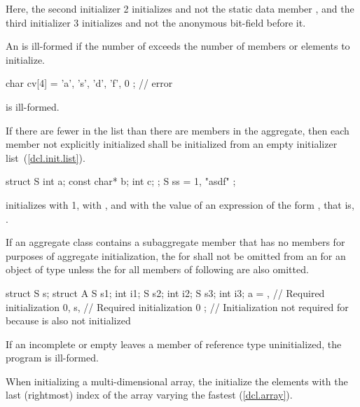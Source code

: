 Here, the second initializer 2 initializes
and not the static data member
, and the third initializer 3 initializes 
and not the anonymous bit-field before it.
\exitexample

\pnum
An
is ill-formed if the number of
exceeds the number of members or elements to initialize.
\enterexample

\begin{codeblock}
char cv[4] = { 'a', 's', 'd', 'f', 0 };     // error
\end{codeblock}

is ill-formed.
\exitexample

\pnum
If there are fewer
in the list than there are members in the aggregate,
then each member not explicitly initialized
shall be
initialized from an empty initializer list~(\ref{dcl.init.list}).
\enterexample

\begin{codeblock}
struct S { int a; const char* b; int c; };
S ss = { 1, "asdf" };
\end{codeblock}

initializes
with 1,
with ,
and
with the value of an expression of the form
,
that is,
.
\exitexample

\pnum
If an aggregate class  contains a subaggregate member
 that has no members for purposes of aggregate initialization,
the  for  shall not be
omitted from an  for an object of type
 unless the  for all
members of  following  are also omitted.
\enterexample

\begin{codeblock}
struct S { } s;
struct A {
  S s1;
  int i1;
  S s2;
  int i2;
  S s3;
  int i3;
} a = {
  { },      // Required initialization
  0,
  s,        // Required initialization
  0
};          // Initialization not required for  because  is also not initialized
\end{codeblock}
\exitexample

\pnum
If an incomplete or empty
leaves a member of reference type uninitialized, the program is ill-formed.

\pnum
When initializing a multi-dimensional array,
the
initialize the elements with the last (rightmost) index of the array
varying the fastest (\ref{dcl.array}).
\enterexample

